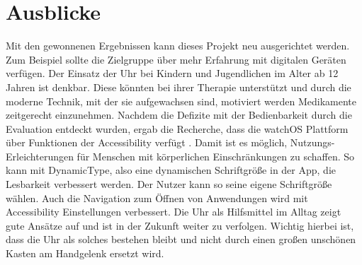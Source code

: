 \section{Ausblicke}
Mit den gewonnenen Ergebnissen kann dieses Projekt neu ausgerichtet werden. Zum Beispiel sollte die Zielgruppe über mehr Erfahrung mit digitalen Geräten verfügen. Der Einsatz der Uhr bei Kindern und Jugendlichen im Alter ab 12 Jahren ist denkbar. Diese könnten bei ihrer Therapie unterstützt und durch die moderne Technik, mit der sie aufgewachsen sind, motiviert werden Medikamente zeitgerecht einzunehmen.
Nachdem die Defizite mit der Bedienbarkeit durch die Evaluation entdeckt wurden, ergab die Recherche, dass die watchOS Plattform über Funktionen der Accessibility verfügt \cite{Apple:watchAccess} . Damit ist es möglich, Nutzungs-Erleichterungen für Menschen mit körperlichen Einschränkungen zu schaffen. So kann mit DynamicType, also eine dynamischen Schriftgröße in der App, die Lesbarkeit verbessert werden. Der Nutzer kann so seine eigene Schriftgröße wählen. Auch die Navigation zum Öffnen von Anwendungen wird mit Accessibility Einstellungen verbessert. Die Uhr als Hilfsmittel im Alltag zeigt gute Ansätze auf und ist in der Zukunft weiter zu verfolgen. Wichtig hierbei ist, dass die Uhr als solches bestehen bleibt und nicht durch einen großen unschönen Kasten am Handgelenk ersetzt wird.

